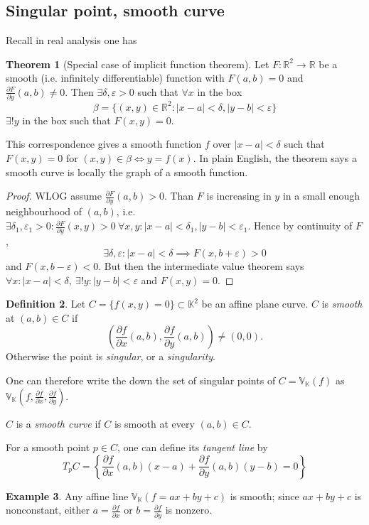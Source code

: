 \documentclass{article}
\newcommand{\R}{\mathbb{R}}
\newcommand{\K}{\mathbb{K}}
\newcommand{\V}{\mathbb{V}}
\theoremstyle{definition}
\newtheorem{defn}{Definition}[subsection]
\newtheorem{thm}[defn]{Theorem}
\newtheorem{example}[defn]{Example}
\begin{document}
\subsection{Singular point, smooth curve}
Recall in real analysis one has
\begin{thm}[Special case of implicit function theorem]
Let $F:\R^2\rightarrow\R$ be a smooth (i.e. infinitely differentiable) function with $F(a,b)=0$ and $\frac{\partial F}{\partial y}(a,b)\neq 0$. Then $\exists \delta,\varepsilon>0$ such that $\forall x$ in the box
\[
\beta=\{(x,y)\in\R^2:|x-a|<\delta,|y-b|<\varepsilon\}
\]
$\exists! y$ in the box such that $F(x,y)=0$.

This correspondence gives a smooth function $f$ over $|x-a|<\delta$ such that $F(x,y)=0$ for $(x,y)\in\beta\iff y=f(x)$. In plain English, the theorem says a smooth curve is locally the graph of a smooth function.
\end{thm}
\begin{proof}
WLOG assume $\frac{\partial F}{\partial y}(a,b)>0$. Than $F$ is increasing in $y$ in a small enough neighbourhood of $(a,b)$, i.e. $\exists\delta_1,\varepsilon_1>0:\frac{\partial F}{\partial y}(x,y)>0 \ \forall x,y:|x-a|<\delta_1,|y-b|<\varepsilon_1$. Hence by continuity of $F$,
\[
\exists\delta,\varepsilon:|x-a|<\delta\implies F(x,b+\varepsilon)>0
\]
and $F(x,b-\varepsilon)<0$. But then the intermediate value theorem says $\forall x:|x-a|<\delta,\ \exists!y:|y-b|<\varepsilon$ and $F(x,y)=0$.
\end{proof}

\begin{defn}
Let $C=\{f(x,y)=0\}\subset\K^2$ be an affine plane curve. $C$ is \textit{smooth} at $(a,b)\in C$ if
\[
\left(\frac{\partial f}{\partial x}(a,b),\frac{\partial f}{\partial y}(a,b)\right)\neq (0,0).
\]
Otherwise the point is \textit{singular}, or a \textit{singularity}.

One can therefore write the down the set of singular points of $C=\V_\K(f)$ as $\V_\K\left(f,\frac{\partial f}{\partial x},\frac{\partial f}{\partial y}\right)$.

$C$ is a \textit{smooth curve} if $C$ is smooth at every $(a,b)\in C$.

For a smooth point $p\in C$, one can define its \textit{tangent line} by
\[
T_pC=\left\{\frac{\partial f}{\partial x}(a,b)(x-a)+\frac{\partial f}{\partial y}(a,b)(y-b)=0\right\}
\]
\end{defn}
\begin{example}
Any affine line $\V_\K(f=ax+by+c)$ is smooth; since $ax+by+c$ is nonconstant, either $a=\frac{\partial f}{\partial x}$ or $b=\frac{\partial f}{\partial y}$ is nonzero.
\end{example}
\end{document}

